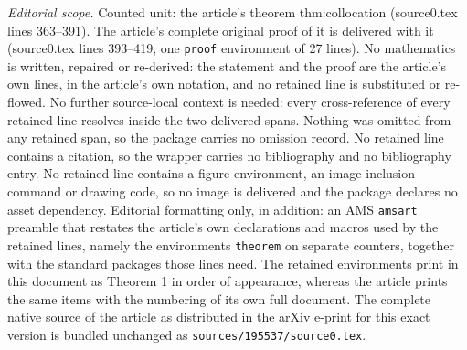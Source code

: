 \documentclass[10pt,a4paper]{amsart}
\begin{document}
\noindent\textit{Editorial scope.} Counted unit: the article's theorem thm:collocation (source0.tex lines 363--391). The article's complete original proof of it is delivered with it (source0.tex lines 393--419, one \texttt{proof} environment of 27 lines). No mathematics is written, repaired or re-derived: the statement and the proof are the article's own lines, in the article's own notation, and no retained line is substituted or re-flowed.  No further source-local context is needed: every cross-reference of every retained line resolves inside the two delivered spans.  Nothing was omitted from any retained span, so the package carries no omission record.  No retained line contains a citation, so the wrapper carries no bibliography and no bibliography entry.  No retained line contains a figure environment, an image-inclusion command or drawing code, so no image is delivered and the package declares no asset dependency.  Editorial formatting only, in addition: an AMS \texttt{amsart} preamble that restates the article's own declarations and macros used by the retained lines, namely the environments \texttt{theorem} on separate counters, together with the standard packages those lines need.  The retained environments print in this document as Theorem 1 in order of appearance, whereas the article prints the same items with the numbering of its own full document.  The complete native source of the article as distributed in the arXiv e-print for this exact version is bundled unchanged as \texttt{sources/195537/source0.tex}.
\end{document}
